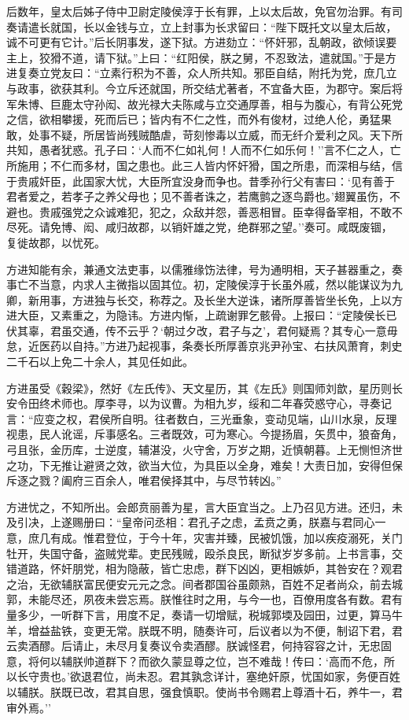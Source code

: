 \documentclass[]{article}
\begin{document}
后数年，皇太后姊子侍中卫尉定陵侯淳于长有罪，上以太后故，免官勿治罪。有司奏请遣长就国，长以金钱与立，立上封事为长求留曰：``陛下既托文以皇太后故，诚不可更有它计。''后长阴事发，遂下狱。方进劾立：``怀奸邪，乱朝政，欲倾误要主上，狡猾不道，请下狱。''上曰：``红阳侯，朕之舅，不忍致法，遣就国。''于是方进复奏立党友曰：``立素行积为不善，众人所共知。邪臣自结，附托为党，庶几立与政事，欲获其利。今立斥还就国，所交结尤著者，不宜备大臣，为郡守。案后将军朱博、巨鹿太守孙闳、故光禄大夫陈咸与立交通厚善，相与为腹心，有背公死党之信，欲相攀援，死而后已；皆内有不仁之性，而外有俊材，过绝人伦，勇猛果敢，处事不疑，所居皆尚残贼酷虐，苛刻惨毒以立威，而无纤介爱利之风。天下所共知，愚者犹惑。孔子曰：`人而不仁如礼何！人而不仁如乐何！''言不仁之人，亡所施用；不仁而多材，国之患也。此三人皆内怀奸猾，国之所患，而深相与结，信于贵戚奸臣，此国家大忧，大臣所宜没身而争也。昔季孙行父有害曰：`见有善于君者爱之，若孝子之养父母也；见不善者诛之，若鹰鹯之逐鸟爵也。'翅翼虽伤，不避也。贵戚强党之众诚难犯，犯之，众敌并怨，善恶相冒。臣幸得备宰相，不敢不尽死。请免博、闳、咸归故郡，以销奸雄之党，绝群邪之望。''奏可。咸既废锢，复徙故郡，以忧死。

方进知能有余，兼通文法吏事，以儒雅缘饬法律，号为通明相，天子甚器重之，奏事亡不当意，内求人主微指以固其位。初，定陵侯淳于长虽外戚，然以能谋议为九卿，新用事，方进独与长交，称荐之。及长坐大逆诛，诸所厚善皆坐长免，上以方进大臣，又素重之，为隐讳。方进内惭，上疏谢罪乞骸骨。上报曰：``定陵侯长已伏其辜，君虽交通，传不云乎？`朝过夕改，君子与之'，君何疑焉？其专心一意毋怠，近医药以自持。''方进乃起视事，条奏长所厚善京兆尹孙宝、右扶风萧育，刺史二千石以上免二十余人，其见任如此。

方进虽受《穀梁》，然好《左氏传》、天文星历，其《左氏》则国师刘歆，星历则长安令田终术师也。厚李寻，以为议曹。为相九岁，绥和二年春荧惑守心，寻奏记言：``应变之权，君侯所自明。往者数白，三光垂象，变动见端，山川水泉，反理视患，民人讹谣，斥事感名。三者既效，可为寒心。今提扬眉，矢贯中，狼奋角，弓且张，金历库，士逆度，辅湛没，火守舍，万岁之期，近慎朝暮。上无恻怛济世之功，下无推让避贤之效，欲当大位，为具臣以全身，难矣！大责日加，安得但保斥逐之戮？阖府三百余人，唯君侯择其中，与尽节转凶。''

方进忧之，不知所出。会郎贲丽善为星，言大臣宜当之。上乃召见方进。还归，未及引决，上遂赐册曰：``皇帝问丞相：君孔子之虑，孟贲之勇，朕嘉与君同心一意，庶几有成。惟君登位，于今十年，灾害并臻，民被饥饿，加以疾疫溺死，关门牡开，失国守备，盗贼党辈。吏民残贼，殴杀良民，断狱岁岁多前。上书言事，交错道路，怀奸朋党，相为隐蔽，皆亡忠虑，群下凶凶，更相嫉妒，其咎安在？观君之治，无欲辅朕富民便安元元之念。间者郡国谷虽颇熟，百姓不足者尚众，前去城郭，未能尽还，夙夜未尝忘焉。朕惟往时之用，与今一也，百僚用度各有数。君有量多少，一听群下言，用度不足，奏请一切增赋，税城郭堧及园田，过更，算马牛羊，增益盐铁，变更无常。朕既不明，随奏许可，后议者以为不便，制诏下君，君云卖酒醪。后请止，未尽月复奏议令卖酒醪。朕诚怪君，何持容容之计，无忠固意，将何以辅朕帅道群下？而欲久蒙显尊之位，岂不难哉！传曰：`高而不危，所以长守贵也。'欲退君位，尚未忍。君其孰念详计，塞绝奸原，忧国如家，务便百姓以辅朕。朕既已改，君其自思，强食慎职。使尚书令赐君上尊酒十石，养牛一，君审外焉。''
\end{document}
